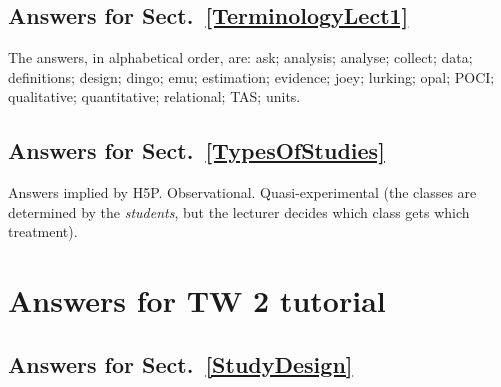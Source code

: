 \documentclass[
  11pt,
  a4paper,
  krantz2]{krantz}
\begin{document}
\begin{footnotesize}
\subsection*{Answers for Sect.~\ref{TerminologyLect1}}\label{answers-for-sect.-refterminologylect1}

The answers, in alphabetical order, are: ask; analysis; analyse; collect; data; definitions; design; dingo; emu; estimation; evidence; joey; lurking; opal; POCI; qualitative; quantitative; relational; TAS; units.

\subsection*{Answers for Sect.~\ref{TypesOfStudies}}\label{answers-for-sect.-reftypesofstudies}

Answers implied by H5P.
Observational.
Quasi-experimental (the classes are determined by the \emph{students}, but the lecturer decides which class gets which treatment).

\section{Answers for TW 2 tutorial}\label{Lecture2Answers}

\subsection*{Answers for Sect.~\ref{StudyDesign}}\label{answers-for-sect.-refstudydesign}


\end{footnotesize}
\end{document}
